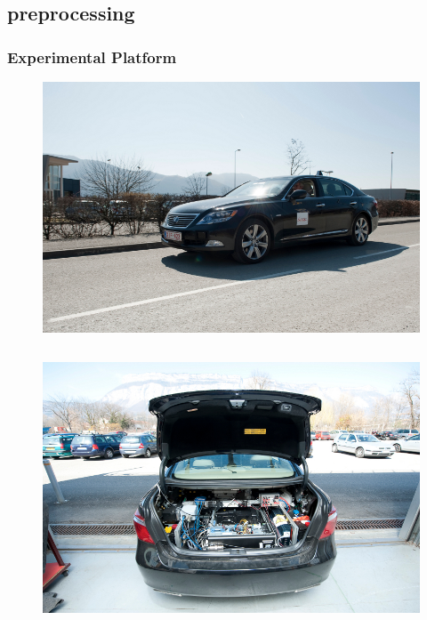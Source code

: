 \documentclass{beamer}
\begin{document}
\subsection{preprocessing}

	\begin{frame}
		\frametitle{Experimental Platform}
		\begin{figure}[h]
			\center
			\includegraphics[scale=0.8]{../img/testbed:car}
		  \end{figure}		
		
		  \begin{columns}[t]
		  \begin{column}{5cm}
		  \begin{figure}[h]
			\center
			\includegraphics[scale=0.7]{../img/testbed:trunc}
		  \end{figure}
		  \end{column}
		  

\end{columns}
\end{frame}
\end{document}
